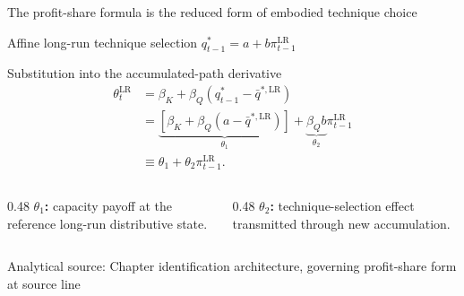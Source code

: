 \documentclass[10pt,aspectratio=169]{beamer}
\newcommand{\LR}{\mathrm{LR}}
\newcommand{\sourcefooter}[1]{%
  \par\vfill{\tiny\color{gray!70}Analytical source: #1}\vspace{-0.35em}}
\begin{document}
\begin{frame}{The profit-share formula is the reduced form of embodied technique choice}
  \begin{block}{Affine long-run technique selection}
    \centering
    \Large $q_{t-1}^*=a+b\pi_{t-1}^{\LR}$
  \end{block}
  \begin{block}{Substitution into the accumulated-path derivative}
    \centering
    \begin{align*}
      \theta_t^{\LR}
      &=\beta_K+\beta_Q\left(q_{t-1}^*-\bar q^{*,\LR}\right)\\
      &=\underbrace{\left[\beta_K+\beta_Q(a-\bar q^{*,\LR})\right]}_{\theta_1}
        +\underbrace{\beta_Qb}_{\theta_2}\pi_{t-1}^{\LR}\\
      &\equiv\theta_1+\theta_2\pi_{t-1}^{\LR}.
    \end{align*}
  \end{block}
  \begin{columns}[T,onlytextwidth]
    \begin{column}{0.48\textwidth}
      \textbf{$\theta_1$:} capacity payoff at the reference long-run distributive state.
    \end{column}
    \begin{column}{0.48\textwidth}
      \textbf{$\theta_2$:} technique-selection effect transmitted through new accumulation.
    \end{column}
  \end{columns}
  \sourcefooter{Chapter identification architecture, governing profit-share form at source line \LineProfitForm}
\end{frame}
\end{document}
